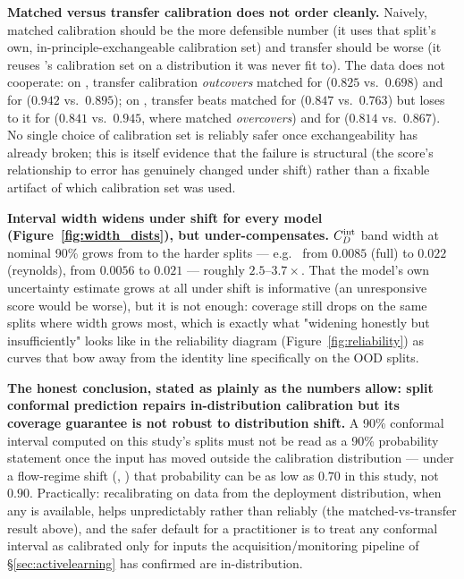 \documentclass[11pt,a4paper]{article}
\begin{document}
\textbf{Matched versus transfer calibration does not order cleanly.} Naively,
matched calibration should be the more defensible number (it uses that split's
own, in-principle-exchangeable calibration set) and transfer should be worse (it
reuses 's calibration set on a distribution it was never fit
to). The data does not cooperate: on , transfer calibration
\emph{outcovers} matched for \Mgnn{} ($0.825$ vs.\ $0.698$) and for \Mfno{}
($0.942$ vs.\ $0.895$); on , transfer beats matched for
\Mfno{} ($0.847$ vs.\ $0.763$) but loses to it for \Mgnn{} ($0.841$ vs.\
$0.945$, where matched \emph{overcovers}) and for \Mtrans{} ($0.814$ vs.\
$0.867$). No single choice of calibration set is reliably safer once
exchangeability has already broken; this is itself evidence that the failure is
structural (the score's relationship to error has genuinely changed under
shift) rather than a fixable artifact of which calibration set was used.

\textbf{Interval width widens under shift for every model (Figure~\ref{fig:width_dists}),
but under-compensates.} $C_D^{\text{int}}$ band width at nominal 90\% grows from
\splitname{full} to the harder splits --- e.g.\ \Mfno{} from $0.0085$ (full) to
$0.022$ (reynolds), \Mtrans{} from $0.0056$ to $0.021$ --- roughly $2.5$--$3.7\times$.
That the model's own uncertainty estimate grows at all under shift is
informative (an unresponsive score would be worse), but it is not enough:
coverage still drops on the same splits where width grows most, which is
exactly what "widening honestly but insufficiently" looks like in the reliability
diagram (Figure~\ref{fig:reliability}) as curves that bow away from the identity
line specifically on the OOD splits.

\textbf{The honest conclusion, stated as plainly as the numbers allow: split
conformal prediction repairs in-distribution calibration but its coverage
guarantee is not robust to distribution shift.} A 90\% conformal interval
computed on this study's splits must not be read as a 90\% probability
statement once the input has moved outside the calibration distribution ---
under a flow-regime shift (\splitname{reynolds}, \splitname{aoa}) that
probability can be as low as $0.70$ in this study, not $0.90$. Practically:
recalibrating on data from the deployment distribution, when any is available,
helps unpredictably rather than reliably (the matched-vs-transfer result
above), and the safer default for a practitioner is to treat any conformal
interval as calibrated only for inputs the acquisition/monitoring pipeline of
\S\ref{sec:activelearning} has confirmed are in-distribution.
\end{document}
